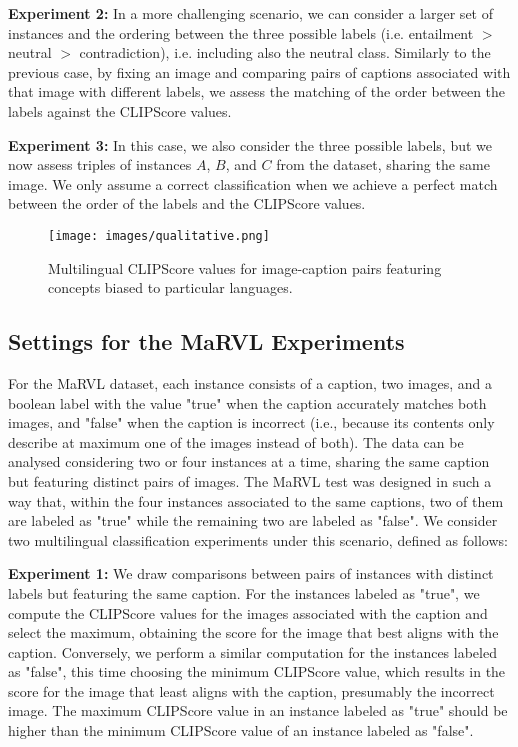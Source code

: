 \textbf{Experiment 2:} In a more challenging scenario, we can consider a larger set of instances and the ordering between the three possible labels (i.e. entailment $>$ neutral $>$  contradiction), i.e. including also the neutral class. Similarly to the previous case, by fixing an image and comparing pairs of captions associated with that image with different labels, we assess the matching of the order between the labels against the CLIPScore values.

\textbf{Experiment 3:} In this case, we also consider the three possible labels, but we now assess triples of instances $A$, $B$, and $C$ from the dataset, sharing the same image. We only assume a correct classification when we achieve a perfect match between the order of the labels and the CLIPScore values.

\begin{figure*}[t!]
  \centering
  \texttt{[image: images/qualitative.png]}
  \caption{Multilingual CLIPScore values for image-caption pairs featuring concepts biased to particular languages.}
  \label{fig:multicultural}
\end{figure*}

\subsection{Settings for the MaRVL Experiments}
For the MaRVL dataset, each instance consists of a caption, two images, and a boolean label with the value "true" when the caption accurately matches both images, and "false" when the caption is incorrect (i.e., because its contents only describe at maximum one of the images instead of both). The data can be analysed considering two or four instances at a time, sharing the same caption but featuring distinct pairs of images. The MaRVL test was designed in such a way that, within the four instances associated to the same captions, two of them are labeled as "true" while the remaining two are labeled as "false". We consider two multilingual classification experiments under this scenario, defined as follows:

\textbf{Experiment 1:} We draw comparisons between pairs of instances with distinct labels but featuring the same caption. For the instances labeled as "true", we compute the CLIPScore values for the images associated with the caption and select the maximum, obtaining the score for the image that best aligns with the caption. Conversely, we perform a similar computation for the instances labeled as "false", this time choosing the minimum CLIPScore value, which results in the score for the image that least aligns with the caption, presumably the incorrect image. The maximum CLIPScore value in an instance labeled as "true" should be higher than the minimum CLIPScore value of an instance labeled as "false".

